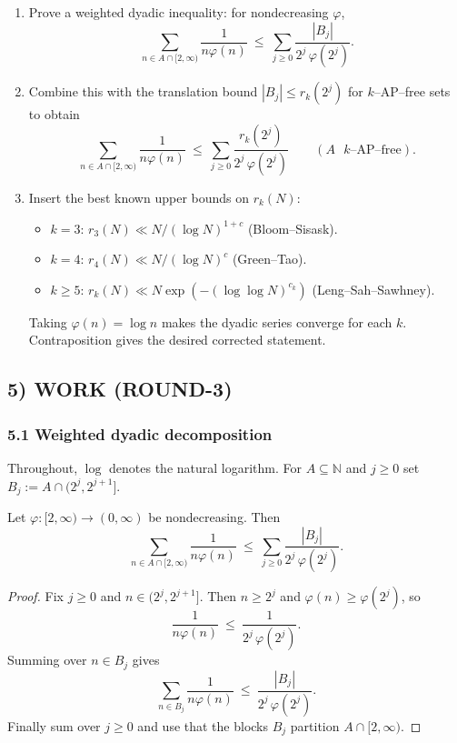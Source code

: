 \begin{enumerate}
\item Prove a weighted dyadic inequality: for nondecreasing $\varphi$,
\[\sum_{n\in A\cap[2,\infty)}\frac{1}{n\varphi(n)}\ \le\ \sum_{j\ge 0}\frac{|B_j|}{2^j\,\varphi(2^j)}.\]
\item Combine this with the translation bound $|B_j|\le r_k(2^j)$ for $k$--AP--free sets to obtain
\[\sum_{n\in A\cap[2,\infty)}\frac{1}{n\varphi(n)}\ \le\ \sum_{j\ge 0}\frac{r_k(2^j)}{2^j\,\varphi(2^j)}\qquad (A\text{ $k$--AP--free}).\]
\item Insert the best known upper bounds on $r_k(N)$:
\begin{itemize}
\item $k=3$: $r_3(N)\ll N/(\log N)^{1+c}$ (Bloom--Sisask).
\item $k=4$: $r_4(N)\ll N/(\log N)^{c}$ (Green--Tao).
\item $k\ge 5$: $r_k(N)\ll N\exp(-(\log\log N)^{c_k})$ (Leng--Sah--Sawhney).
\end{itemize}
Taking $\varphi(n)=\log n$ makes the dyadic series converge for each $k$. Contraposition gives the desired corrected statement.
\end{enumerate}

\subsection{5) WORK (ROUND-3)}

\subsubsection{5.1 Weighted dyadic decomposition}

Throughout, $\log$ denotes the natural logarithm. For $A\subseteq\mathbb{N}$ and $j\ge 0$ set $B_j:=A\cap(2^j,2^{j+1}]$.

\begin{lemma}
\label{lem:weighted-dyadic}
Let $\varphi:[2,\infty)\to(0,\infty)$ be nondecreasing. Then
\[
\sum_{n\in A\cap[2,\infty)}\frac{1}{n\varphi(n)}
\ \le\ \sum_{j\ge 0}\frac{|B_j|}{2^j\,\varphi(2^j)}.
\]
\end{lemma}

\begin{proof}
Fix $j\ge 0$ and $n\in(2^j,2^{j+1}]$. Then $n\ge 2^j$ and $\varphi(n)\ge \varphi(2^j)$, so
\[
\frac{1}{n\varphi(n)}\ \le\ \frac{1}{2^j\,\varphi(2^j)}.
\]
Summing over $n\in B_j$ gives
\[
\sum_{n\in B_j}\frac{1}{n\varphi(n)}\ \le\ \frac{|B_j|}{2^j\,\varphi(2^j)}.
\]
Finally sum over $j\ge 0$ and use that the blocks $B_j$ partition $A\cap[2,\infty)$.
\end{proof}

